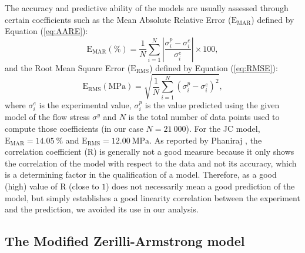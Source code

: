 \documentclass[twoside,english,1p,final,sort&compress]{elsarticle}
\theoremstyle{plain}
\DeclareRobustCommand{\RMSE}{\text{E}_\text{RMS}}
\DeclareRobustCommand{\MARE}{\text{E}_\text{MAR}}
\DeclareRobustCommand{\R}{\text{R}}
\DeclareRobustCommand{\MPa}{\text{MPa}}
\begin{document}
The accuracy and predictive ability of the models are usually assessed through certain coefficients such as the Mean Absolute Relative Error ($\MARE$) defined by Equation (\ref{eq:AARE}):
\begin{equation}
\MARE(\%) = \frac{1}{N} \sum_{i=1}^{N}{\left|\frac{\sigma_i^p -\sigma_i^e}{\sigma_i^e}\right|} \times 100, \label{eq:AARE}
\end{equation}
and the Root Mean Square Error ($\RMSE$) defined by Equation (\ref{eq:RMSE}):
\begin{equation}
\RMSE (\MPa) = \sqrt{\frac{1}{N} \sum_{i=1}^{N} \left(\sigma_i^p - \sigma_i^e\right)^2}, \label{eq:RMSE}
\end{equation}
where $\sigma_i^e$ is the experimental value, $\sigma_i^p$ is the value predicted using the given model of the flow stress $\sigma^y$ and $N$ is the total number of data points used to compute those coefficients (in our case $N=21~000$).
For the JC model, $\MARE=14.05~\%$ and $\RMSE=12.00~\MPa$.
As reported by Phaniraj \cite{Phaniraj-2003}, the correlation coefficient ($\R$) is generally not a good measure because it only shows the correlation of the model with respect to the data and not its accuracy, which is a determining factor in the qualification of a model.
Therefore, as a good (high) value of $\R$ (close to $1$) does not necessarily mean a good prediction of the model, but simply establishes a good linearity correlation between the experiment and the prediction, we avoided its use in our analysis.

\subsection{The Modified Zerilli-Armstrong model\label{sec:MZA}}
\end{document}
